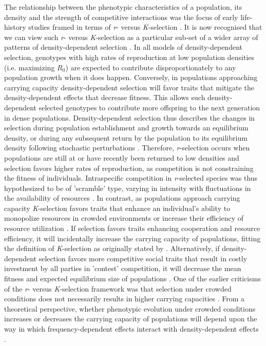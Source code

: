 \documentclass{article}
\begin{document}
 The relationship between the phenotypic characteristics of a population, its density and the strength of competitive interactions was the focus of early life-history studies framed in terms of \textit{r}- versus \textit{K}-selection \citep{macarthur1967theory}. It is now recognised that we can view such \textit{r}- versus \textit{K}-selection as a particular sub-set of a wider array of patterns of density-dependent selection \citep{Wright2018, Engen2020}. In all models of density-dependent selection, genotypes with high rates of reproduction at low population densities (i.e. maximizing $R_0$) are expected to contribute disproportionately to any population growth when it does happen. Conversely, in populations approaching carrying capacity density-dependent selection will favor traits that mitigate the density-dependent effects that decrease fitness. This allows such density-dependent selected genotypes to contribute more offspring to the next generation in dense populations. Density-dependent selection thus describes the changes in selection during population establishment and growth towards an equilibrium density, or during any subsequent return by the population to its equilibrium density following stochastic perturbations  \citep{Engen2013}. Therefore, \textit{r}-selection occurs when populations are still at or have recently been returned to low densities and selection favors higher rates of reproduction, as competition is not constraining the fitness of individuals. Intraspecific competition in \textit{r}-selected species was thus hypothesized to be of 'scramble' type, varying in intensity with fluctuations in the availability of resources \citep{Southwood1977}. In contrast, as populations approach carrying capacity \textit{K}-selection favors traits that enhance an individual's ability to monopolize resources in crowded environments or increase their efficiency of resource utilization \citep{Boyce1984}. If selection favors traits enhancing cooperation and resource efficiency, it will incidentally increase the carrying capacity of populations, fitting the definition of \textit{K}-selection as originally stated by \cite{macarthur1967theory}. Alternatively, if density-dependent selection favors more competitive social traits that result in costly investment by all parties in 'contest' competition, it will decrease the mean fitness and expected equilibrium size of populations \citep{Joshi2001, Engen2020}. One of the earlier criticisms of the \textit{r}- versus \textit{K}-selection framework was that selection under crowded conditions does not necessarily results in higher carrying capacities \citep{Boyce1984}. From a theoretical perspective, whether phenotypic evolution under crowded conditions increases or decreases the carrying capacity of populations will depend upon the way in which frequency-dependent effects interact with  density-dependent effects \citep{Engen2020}. 
\end{document}
